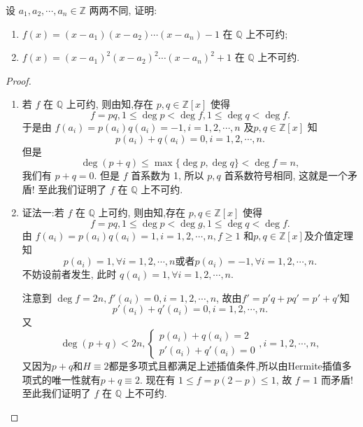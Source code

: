 \documentclass[../../main.tex]{subfiles}
\begin{document}
\begin{example}
设 \( a_1,a_2,\cdots,a_n \in \mathbb{Z} \) 两两不同, 证明:
\begin{enumerate}
\item \( f(x) = (x - a_1)(x - a_2)\cdots(x - a_n) - 1 \) 在 \( \mathbb{Q} \) 上不可约;

\item \( f(x) = (x - a_1)^2(x - a_2)^2\cdots(x - a_n)^2 + 1 \) 在 \( \mathbb{Q} \) 上不可约.
\end{enumerate}
\end{example}
\begin{proof}
\begin{enumerate}
\item 若 \( f \) 在 \( \mathbb{Q} \) 上可约, 则由知,存在 \( p,q \in \mathbb{Z}[x] \) 使得
\[
f = pq, 1 \leqslant \deg p < \deg f, 1 \leqslant \deg q < \deg f.
\]
于是由 \( f(a_i) = p(a_i)q(a_i) = -1, i = 1,2,\cdots,n \) 及\( p,q \in \mathbb{Z}[x] \) 知
\[
p(a_i) + q(a_i) = 0, i = 1,2,\cdots,n.
\]
但是
\[
\deg(p + q) \leqslant \max\{\deg p, \deg q\} < \deg f = n,
\]
我们有 \( p + q = 0 \). 但是 \( f \) 首系数为 1, 所以 \( p,q \) 首系数符号相同, 这就是一个矛盾! 至此我们证明了 \( f \) 在 \( \mathbb{Q} \) 上不可约.

\item {\color{blue}证法一:}若 \( f \) 在 \( \mathbb{Q} \) 上可约, 则由知,存在 \( p,q \in \mathbb{Z}[x] \) 使得
\[
f = pq, 1 \leqslant \deg p < \deg g, 1 \leqslant \deg q < \deg f.
\]
由 \( f(a_i) = p(a_i)q(a_i) = 1, i = 1,2,\cdots,n, f \geqslant 1 \) 和\( p,q \in \mathbb{Z}[x] \)及介值定理知
\[
p(a_i) = 1, \forall i = 1,2,\cdots,n \text{或者} p(a_i) = -1, \forall i = 1,2,\cdots,n.
\]
不妨设前者发生, 此时 \( q(a_i) = 1, \forall i = 1,2,\cdots,n \).

注意到 \( \deg f = 2n, f'(a_i) = 0, i = 1,2,\cdots,n \), 故由$f'=p'q+pq'=p'+q'$知
\[p'(a_i) + q'(a_i) = 0, i = 1,2,\cdots,n .\] 又
\[
\deg(p + q) < 2n, \begin{cases} p(a_i) + q(a_i) = 2 \\ p'(a_i) + q'(a_i) = 0 \end{cases}, i = 1,2,\cdots,n,
\]
又因为$p+q$和$H\equiv 2$都是多项式且都满足上述插值条件,所以由Hermite插值多项式的唯一性就有\( p + q \equiv 2 \). 现在有 \( 1 \leqslant f = p(2 - p) \leqslant 1 \), 故 \( f = 1 \) 而矛盾! 至此我们证明了 \( f \) 在 \( \mathbb{Q} \) 上不可约.


\end{enumerate}
\end{proof}
\end{document}
